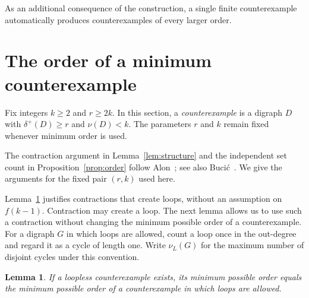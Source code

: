\documentclass[10pt,a4paper]{article}
\newtheorem{lemma}[theorem]{Lemma}
\numberwithin{equation}{section}
\begin{document}
As an additional consequence of the construction, a single finite counterexample automatically produces counterexamples of every larger order. %


\section{The order of a minimum counterexample}\label{sec:order}


Fix integers $k\ge2$ and $r\ge2k$. In this section, a \textit{counterexample} is
a digraph $D$ with $\delta^+(D)\ge r$ and $\nu(D)<k$. The parameters
$r$ and $k$ remain fixed whenever minimum order is used.


The contraction argument in Lemma~\ref{lem:structure} and the
independent set count in Proposition~\ref{prop:order} follow
Alon~\cite[Claims~1 and~2]{alonJCTB68}; see also
Buci\'c~\cite[Propositions~3.1 and~3.2]{bucicDM341}.
We give the arguments for the fixed pair $(r,k)$ used here. 


Lemma~\ref{lem:loops} justifies contractions that create loops,
without an assumption on $f(k-1)$.
Contraction may create a loop. The next lemma allows us to use such a
contraction without changing the minimum possible order of a
counterexample. For a digraph $G$ in which loops are allowed, count a
loop once in the out-degree and regard it as a cycle of length one.
Write $\nu_L(G)$ for the maximum number of disjoint cycles under
this convention.


\begin{lemma}\label{lem:loops}
If a loopless counterexample exists, its minimum possible order equals
the minimum possible order of a counterexample in which loops are
allowed.
\end{lemma}
\end{document}
